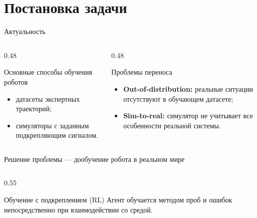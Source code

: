 \section{Постановка задачи}

\begin{frame}[shrink=15]{Актуальность}
    \footnotesize
    \begin{columns}[T,onlytextwidth]
        \begin{column}{0.48\textwidth}
            \begin{block}{Основные способы обучения роботов}
                \begin{itemize}
                    \item датасеты экспертных траекторий;
                    \item симуляторы с заданным подкрепляющим сигналом.
                \end{itemize}
            \end{block}
        \end{column}
        \begin{column}{0.48\textwidth}
            \begin{alertblock}{Проблемы переноса}
                \begin{itemize}
                    \item \textbf{Out-of-distribution:} реальные ситуации отсутствуют
                          в обучающем датасете;
                    \item \textbf{Sim-to-real:} симулятор не учитывает все особенности
                          реальной системы.
                \end{itemize}
            \end{alertblock}
        \end{column}
    \end{columns}

    \vspace{0.1em}
    \centering
    \normalsize
    Решение проблемы --- дообучение робота в реальном мире

    \vspace{0.3em}
    \begin{columns}[T,onlytextwidth]
        \begin{column}{0.55\textwidth}
            \begin{block}{Обучение с подкреплением (RL)}
                Агент обучается методом проб и ошибок непосредственно при
                взаимодействии со средой.


\end{block}
\end{column}
\end{columns}
\end{frame}

